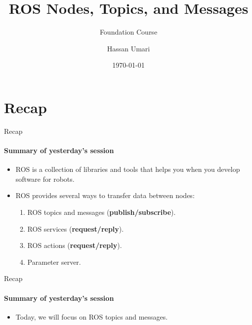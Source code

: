 \documentclass{beamer}
\author[MAS]{Hassan Umari}
\title{ROS Nodes, Topics, and Messages}
\subtitle{Foundation Course}
\institute[HBRS]{Hochschule Bonn-Rhein-Sieg}
\date{\today}
\begin{document}
{
\begin{frame}
\titlepage
\end{frame}
}


\section{Recap}
\begin{frame}{Recap}
    \framesubtitle{Summary of yesterday's session}
    \begin{itemize}
        \item ROS is a collection of libraries and tools that helps you when you develop software for robots.
              
        \item ROS provides several ways to transfer data between nodes:
        
        \begin{enumerate}
            \item ROS topics and messages (\textbf{publish/subscribe}).
            \item ROS services (\textbf{request/reply}).
            \item ROS actions (\textbf{request/reply}).
            \item Parameter server.
        \end{enumerate}   
    \end{itemize}
\end{frame}


\begin{frame}{Recap}
    \framesubtitle{Summary of yesterday's session}
    \begin{itemize}
        \item Today, we will focus on ROS topics and messages.
    \end{itemize}
\end{frame}
\end{document}
